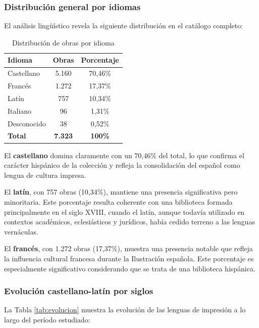 \documentclass[12pt,a4paper]{article}
\begin{document}
\subsubsection{Distribución general por idiomas}

El análisis lingüístico revela la siguiente distribución en el catálogo completo:

\begin{table}[h]
\centering
\caption{Distribución de obras por idioma}
\label{tab:idiomas}
\begin{tabular}{lcc}
\toprule
\textbf{Idioma} & \textbf{Obras} & \textbf{Porcentaje} \\
\midrule
Castellano & 5.160 & 70,46\% \\
Francés & 1.272 & 17,37\% \\
Latín & 757 & 10,34\% \\
Italiano & 96 & 1,31\% \\
Desconocido & 38 & 0,52\% \\
\midrule
\textbf{Total} & \textbf{7.323} & \textbf{100\%} \\
\bottomrule
\end{tabular}
\end{table}

El \textbf{castellano} domina claramente con un 70,46\% del total, lo que confirma el carácter hispánico de la colección y refleja la consolidación del español como lengua de cultura impresa.

El \textbf{latín}, con 757 obras (10,34\%), mantiene una presencia significativa pero minoritaria. Este porcentaje resulta coherente con una biblioteca formada principalmente en el siglo XVIII, cuando el latín, aunque todavía utilizado en contextos académicos, eclesiásticos y jurídicos, había cedido terreno a las lenguas vernáculas.

El \textbf{francés}, con 1.272 obras (17,37\%), muestra una presencia notable que refleja la influencia cultural francesa durante la Ilustración española. Este porcentaje es especialmente significativo considerando que se trata de una biblioteca hispánica.

\subsubsection{Evolución castellano-latín por siglos}

La Tabla \ref{tab:evolucion} muestra la evolución de las lenguas de impresión a lo largo del período estudiado:
\end{document}
